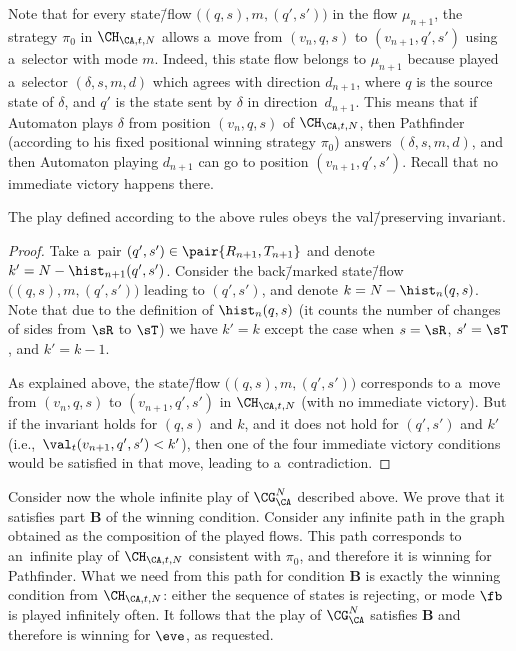 \documentclass{lmcs}
\numberwithin{equation}{section}
\numberwithin{figure}{section}
\newcommand{\itemfont}[1]{\textbf{#1}}
\begin{document}
Note that for every state\=/flow $\big((q,s),m,(q',s')\big)$ in the flow $\mu_{n+1}$, the strategy $\pi_0$ in $\CH_{\CA,t,N}$ allows a~move from $(v_n,q,s)$ to $(v_{n+1},q',s')$ using a~selector with mode $m$.
Indeed, this state flow belongs to $\mu_{n+1}$ because \eve played a~selector $(\delta,s,m,d)$ which agrees with direction $d_{n+1}$,
where $q$ is the source state of $\delta$, and $q'$ is the state sent by $\delta$ in direction~$d_{n+1}$.
This means that if Automaton plays $\delta$ from position $(v_n,q,s)$ of $\CH_{\CA,t,N}$, then Pathfinder (according to his fixed positional winning strategy $\pi_0$) answers $(\delta,s,m,d)$,
and then Automaton playing $d_{n+1}$ can go to position $(v_{n+1},q',s')$.
Recall that no immediate victory happens there.

\begin{clm}\label{claim-invariant}
The play defined according to the above rules obeys the val\=/preserving invariant.
\end{clm}

\begin{proof}
	Take a~pair $(q',s')\in\pair{R_{n+1},T_{n+1}}$ and denote $k'=N-\hist_{n+1}(q',s')$.
	Consider the back\=/marked state\=/flow $\big((q,s),m,(q',s')\big)$ leading to $(q',s')$, and denote $k=N-\hist_{n}(q,s)$.
	Note that due to the definition of $\hist_n(q,s)$ (it counts the number of changes of sides from $\sR$ to $\sT$) we have $k'=k$ except the case when $s=\sR$, $s'=\sT$, and $k'=k{-}1$.
	
	As explained above, the state\=/flow $\big((q,s),m,(q',s')\big)$ corresponds to a~move from $(v_n,q,s)$ to $(v_{n+1},q',s')$ in $\CH_{\CA,t,N}$ (with no immediate victory).
	But if the invariant holds for $(q,s)$ and $k$, and it does not hold for $(q',s')$ and $k'$ (i.e.,~$\val_t(v_{n+1},q',s')< k'$),
	then one of the four immediate victory conditions would be satisfied in that move, leading to a~contradiction.
\end{proof}

Consider now the whole infinite play of $\CG^N_\CA$ described above.
We prove that it satisfies part \itemfont{B} of the winning condition.
Consider any infinite path in the graph obtained as the composition of the played flows.
This path corresponds to an~infinite play of $\CH_{\CA,t,N}$ consistent with $\pi_0$, and therefore it is winning for Pathfinder.
What we need from this path for condition \itemfont{B} is exactly the winning condition from $\CH_{\CA,t,N}$: either the sequence of states is rejecting, or mode $\fb$ is played infinitely often.
It follows that the play of $\CG^N_\CA$ satisfies \itemfont{B} and therefore is winning for $\eve$, as requested.
\end{document}
